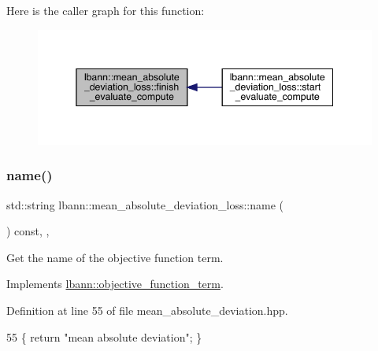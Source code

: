 Here is the caller graph for this function\+:\nopagebreak
\begin{figure}[H]
\begin{center}
\leavevmode
\includegraphics[width=345pt]{classlbann_1_1mean__absolute__deviation__loss_ab0a19f6393ef5df9275f1ed4802e8cf6_icgraph}
\end{center}
\end{figure}
\mbox{\label{classlbann_1_1mean__absolute__deviation__loss_a05e9ac150bf3875ebb0a81e07ac3dfa0}} 
\subsubsection{\texorpdfstring{name()}{name()}}
{\footnotesize\ttfamily std\+::string lbann\+::mean\+\_\+absolute\+\_\+deviation\+\_\+loss\+::name (\begin{DoxyParamCaption}{ }\end{DoxyParamCaption}) const\hspace{0.3cm}{\ttfamily [inline]}, {\ttfamily [override]}, {\ttfamily [virtual]}}

Get the name of the objective function term. 

Implements \hyperlink{classlbann_1_1objective__function__term_a964fbfad3dd0434aa8f32c5fedf1079a}{lbann\+::objective\+\_\+function\+\_\+term}.



Definition at line 55 of file mean\+\_\+absolute\+\_\+deviation.\+hpp.


\begin{DoxyCode}
55 \{ \textcolor{keywordflow}{return} \textcolor{stringliteral}{"mean absolute deviation"}; \}
\end{DoxyCode}
\mbox{\label{classlbann_1_1mean__absolute__deviation__loss_a0c69f9e73a06208ccea56b61ba38726f}} 

